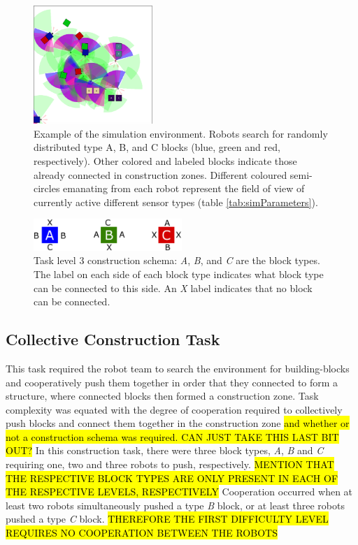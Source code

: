 \begin{figure}[t]
	\centering
	\includegraphics[width=0.40\textwidth]{TaskEnv.eps}
	\caption{Example of the simulation environment.  Robots search for randomly distributed
		type A, B, and C blocks (blue, green and red, respectively).  Other colored and labeled
		blocks indicate those already connected in construction zones.
		Different coloured semi-circles emanating from each
		robot represent the field of view of currently active different sensor types (table \ref{tab:simParameters}).}\label{fig:taskEnv}
\end{figure}


\begin{figure}[t]
	\centering
	\includegraphics[width=0.5\textwidth]{ConstructionSchema.eps}
	\caption{Task level 3 construction schema: \textit{A}, \textit{B}, and \textit{C} are the block types.  The label on
		each side of each block type indicates what block type can be connected to this side.  An \textit{X} label indicates
		that no block can be connected.}\label{fig:constructionSchema}
\end{figure}

\subsection{Collective Construction Task}\label{subsec:constructionTask}
This task required the robot team to search the environment for building-blocks and
cooperatively push them together in order that they connected to form a structure,
where connected blocks then formed a construction zone.
Task complexity was equated with the degree of cooperation required to collectively
push blocks and connect them together in the construction zone \hl{and whether or not
a construction schema was required. CAN JUST TAKE THIS LAST BIT OUT?}
In this construction task, there were three block types, \textit{A}, \textit{B} and \textit{C}
requiring one, two and three robots to push, respectively. \hl{MENTION THAT THE RESPECTIVE BLOCK TYPES ARE ONLY PRESENT IN EACH OF THE RESPECTIVE LEVELS, RESPECTIVELY}
Cooperation occurred when at least two robots simultaneously pushed a type \textit{B} block,
or at least three robots pushed a type \textit{C} block. \hl{THEREFORE THE FIRST DIFFICULTY LEVEL REQUIRES NO COOPERATION BETWEEN THE ROBOTS}

